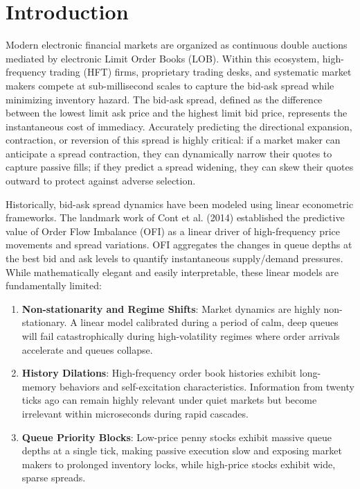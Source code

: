 \documentclass[11pt,a4paper]{article}
\begin{document}
\newpage
\tableofcontents
\newpage

\section{Introduction}
Modern electronic financial markets are organized as continuous double auctions mediated by electronic Limit Order Books (LOB). Within this ecosystem, high-frequency trading (HFT) firms, proprietary trading desks, and systematic market makers compete at sub-millisecond scales to capture the bid-ask spread while minimizing inventory hazard. The bid-ask spread, defined as the difference between the lowest limit ask price and the highest limit bid price, represents the instantaneous cost of immediacy. Accurately predicting the directional expansion, contraction, or reversion of this spread is highly critical: if a market maker can anticipate a spread contraction, they can dynamically narrow their quotes to capture passive fills; if they predict a spread widening, they can skew their quotes outward to protect against adverse selection.

Historically, bid-ask spread dynamics have been modeled using linear econometric frameworks. The landmark work of Cont et al. (2014) established the predictive value of Order Flow Imbalance (OFI) as a linear driver of high-frequency price movements and spread variations. OFI aggregates the changes in queue depths at the best bid and ask levels to quantify instantaneous supply/demand pressures. While mathematically elegant and easily interpretable, these linear models are fundamentally limited:
\begin{enumerate}
    \item \textbf{Non-stationarity and Regime Shifts}: Market dynamics are highly non-stationary. A linear model calibrated during a period of calm, deep queues will fail catastrophically during high-volatility regimes where order arrivals accelerate and queues collapse.
    \item \textbf{History Dilations}: High-frequency order book histories exhibit long-memory behaviors and self-excitation characteristics. Information from twenty ticks ago can remain highly relevant under quiet markets but become irrelevant within microseconds during rapid cascades.
    \item \textbf{Queue Priority Blocks}: Low-price penny stocks exhibit massive queue depths at a single tick, making passive execution slow and exposing market makers to prolonged inventory locks, while high-price stocks exhibit wide, sparse spreads.
\end{enumerate}
\end{document}
